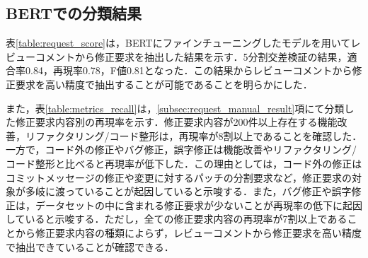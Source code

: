 \documentclass[11pt]{jreport}
\begin{document}
\subsection{BERTでの分類結果}
表\ref{table:request_score}は，BERTにファインチューニングしたモデルを用いてレビューコメントから修正要求を抽出した結果を示す．5分割交差検証の結果，適合率0.84，再現率0.78，F値0.81となった．この結果からレビューコメントから修正要求を高い精度で抽出することが可能であることを明らかにした．

\begin{table}[t]
\centering
  \caption{修正要求の予測精度}
  \label{table:request_score}
\end{table}

また，表\ref{table:metrics_recall}は，\ref{subsec:request_manual_result}項にて分類した修正要求内容別の再現率を示す．修正要求内容が200件以上存在する機能改善，リファクタリング/コード整形は，再現率が8割以上であることを確認した．一方で，コード外の修正やバグ修正，誤字修正は機能改善やリファクタリング/コード整形と比べると再現率が低下した．この理由としては，コード外の修正はコミットメッセージの修正や変更に対するパッチの分割要求など，修正要求の対象が多岐に渡っていることが起因していると示唆する．また，バグ修正や誤字修正は，データセットの中に含まれる修正要求が少ないことが再現率の低下に起因していると示唆する．ただし，全ての修正要求内容の再現率が7割以上であることから修正要求内容の種類によらず，レビューコメントから修正要求を高い精度で抽出できていることが確認できる．

\begin{table}[t]
\centering
  \caption{修正要求内容毎の再現率}
  \label{table:metrics_recall}
\end{table}
\end{document}

